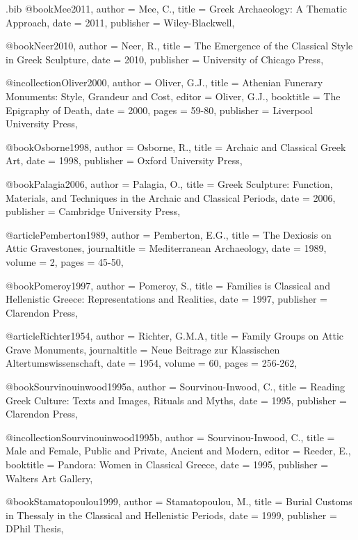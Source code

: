 \begin{filecontents}{\IJSRAidentifier.bib}
	@book{Mee2011,
		author = {Mee, C.},
		title = {Greek Archaeology: A Thematic Approach},
		date = {2011},
		publisher = {Wiley-Blackwell},
	}

	@book{Neer2010,
		author = {Neer, R.},
		title = {The Emergence of the Classical Style in Greek Sculpture},
		date = {2010},
		publisher = {University of Chicago Press},
	}

	@incollection{Oliver2000,
		author = {Oliver, G.J.},
		title = {Athenian Funerary Monuments: Style, Grandeur and Cost},
		editor = {Oliver, G.J.},
		booktitle = {The Epigraphy of Death},
		date = {2000},
		pages = {59-80},
		publisher = {Liverpool University Press},
	}

	@book{Osborne1998,
		author = {Osborne, R.},
		title = {Archaic and Classical Greek Art},
		date = {1998},
		publisher = {Oxford University Press},
	}

	@book{Palagia2006,
		author = {Palagia, O.},
		title = {Greek Sculpture: Function, Materials, and Techniques in the Archaic and Classical Periods},
		date = {2006},
		publisher = {Cambridge University Press},
	}

	@article{Pemberton1989,
		author = {Pemberton, E.G.},
		title = {The Dexiosis on Attic Gravestones},
		journaltitle = {Mediterranean Archaeology},
		date = {1989},
		volume = {2},
		pages = {45-50},
	}

	@book{Pomeroy1997,
		author = {Pomeroy, S.},
		title = {Families is Classical and Hellenistic Greece: Representations and Realities},
		date = {1997},
		publisher = {Clarendon Press},
	}

	@article{Richter1954,
		author = {Richter, G.M.A},
		title = {Family Groups on Attic Grave Monuments},
		journaltitle = {Neue Beitrage zur Klassischen Altertumswissenschaft},
		date = {1954},
		volume = {60},
		pages = {256-262},
	}

	@book{Sourvinouinwood1995a,
		author = {Sourvinou-Inwood, C.},
		title = {Reading Greek Culture: Texts and Images, Rituals and Myths},
		date = {1995},
		publisher = {Clarendon Press},
	}

	@incollection{Sourvinouinwood1995b,
		author = {Sourvinou-Inwood, C.},
		title = {Male and Female, Public and Private, Ancient and Modern},
		editor = {Reeder, E.},
		booktitle = {Pandora: Women in Classical Greece},
		date = {1995},
		publisher = {Walters Art Gallery},
	}

	@book{Stamatopoulou1999,
		author = {Stamatopoulou, M.},
		title = {Burial Customs in Thessaly in the Classical and Hellenistic Periods},
		date = {1999},
		publisher = {DPhil Thesis},
	}


\end{filecontents}
